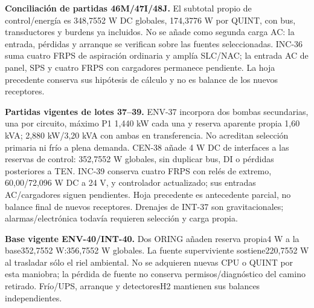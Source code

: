 \textbf{Conciliación de partidas 46M/47I/48J.} El subtotal propio de control/energía es 348,7552 W DC globales, 174,3776 W por QUINT, con bus, transductores y burdens ya incluidos. No se añade como segunda carga AC: la entrada, pérdidas y arranque se verifican sobre las fuentes seleccionadas. INC-36 suma cuatro FRPS de aspiración ordinaria y amplía SLC/NAC; la entrada AC de panel, SPS y cuatro FRPS con cargadores permanece pendiente. La hoja precedente conserva sus hipótesis de cálculo y no es balance de los nuevos receptores.

\textbf{Partidas vigentes de lotes 37--39.} ENV-37 incorpora dos bombas secundarias, una por circuito, máximo P1 1,440 kW cada una y reserva aparente propia 1,60 kVA; 2,880 kW/3,20 kVA con ambas en transferencia. No acreditan selección primaria ni frío a plena demanda. CEN-38 añade 4 W DC de interfaces a las reservas de control: 352,7552 W globales, sin duplicar bus, DI o pérdidas posteriores a TEN. INC-39 conserva cuatro FRPS con relés de extremo, 60,00/72,096 W DC a 24 V, y controlador actualizado; sus entradas AC/cargadores siguen pendientes. Hoja precedente es antecedente parcial, no balance final de nuevos receptores. Drenajes de INT-37 son gravitacionales; alarmas/electrónica todavía requieren selección y carga propia.

\textbf{Base vigente ENV-40/INT-40.} Dos ORING añaden reserva propia4 W a la base352,7552 W:356,7552 W globales. La fuente superviviente sostiene220,7552 W al trasladar sólo el riel ambiental. No se adquieren nuevas CPU o QUINT por esta maniobra; la pérdida de fuente no conserva permisos/diagnóstico del camino retirado. Frío/UPS, arranque y detectoresH2 mantienen sus balances independientes.
